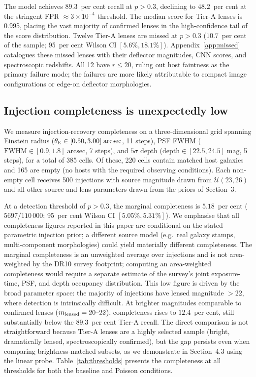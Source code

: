 \documentclass[fleqn,usenatbib]{mnras}
\begin{document}
The model achieves $89.3$~per cent recall at $p > 0.3$, declining to $48.2$~per cent at the stringent FPR $\approx 3 \times 10^{-4}$ threshold.  The median score for Tier-A lenses is 0.995, placing the vast majority of confirmed lenses in the high-confidence tail of the score distribution.  Twelve Tier-A lenses are missed at $p > 0.3$ ($10.7$~per cent of the sample; 95~per cent Wilson CI $[5.6\%, 18.1\%]$).  Appendix~\ref{app:missed} catalogues these missed lenses with their deflector magnitudes, CNN scores, and spectroscopic redshifts.  All 12 have $r \leq 20$, ruling out host faintness as the primary failure mode; the failures are more likely attributable to compact image configurations or edge-on deflector morphologies.

\subsection{Injection completeness is unexpectedly low}

We measure injection-recovery completeness on a three-dimensional grid spanning Einstein radius ($\theta_{\rm E} \in [0.50, 3.00]\;\mathrm{arcsec}$, 11 steps), PSF FWHM ($\mathrm{FWHM} \in [0.9, 1.8]\;\mathrm{arcsec}$, 7 steps), and $5\sigma$ depth ($\mathrm{depth} \in [22.5, 24.5]\;\mathrm{mag}$, 5 steps), for a total of 385 cells.  Of these, 220 cells contain matched host galaxies and 165 are empty (no hosts with the required observing conditions).  Each non-empty cell receives 500 injections with source magnitude drawn from $\mathcal{U}(23, 26)$ and all other source and lens parameters drawn from the priors of Section~3.

At a detection threshold of $p > 0.3$, the marginal completeness is $5.18$~per cent ($5697 / 110\,000$; 95~per cent Wilson CI $[5.05\%, 5.31\%]$).  We emphasise that all completeness figures reported in this paper are conditional on the stated parametric injection prior; a different source model (e.g.\ real galaxy stamps, multi-component morphologies) could yield materially different completeness.  The marginal completeness is an unweighted average over injections and is not area-weighted by the DR10 survey footprint; computing an area-weighted completeness would require a separate estimate of the survey's joint exposure-time, PSF, and depth occupancy distribution.  This low figure is driven by the broad parameter space: the majority of injections have lensed magnitude $> 22$, where detection is intrinsically difficult.  At brighter magnitudes comparable to confirmed lenses ($m_{\rm lensed} = 20\text{--}22$), completeness rises to $12.4$~per cent, still substantially below the $89.3$~per cent Tier-A recall.  The direct comparison is not straightforward because Tier-A lenses are a highly selected sample (bright, dramatically lensed, spectroscopically confirmed), but the gap persists even when comparing brightness-matched subsets, as we demonstrate in Section~4.3 using the linear probe.  Table~\ref{tab:thresholds} presents the completeness at all thresholds for both the baseline and Poisson conditions.
\end{document}
